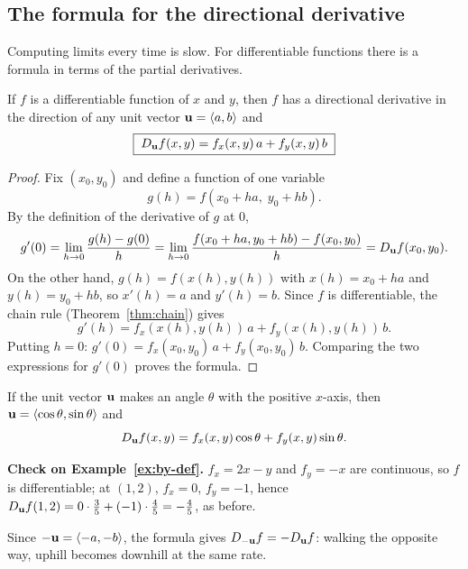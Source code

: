 \subsection{The formula for the directional derivative}

Computing limits every time is slow. For differentiable functions there is a
formula in terms of the partial derivatives.

\begin{theorem}[Slides]\label{thm:Du-formula}
If $f$ is a differentiable function of $x$ and $y$, then $f$ has a directional
derivative in the direction of any unit vector $\mathbf{u}=\left\langle a,b \right\rangle$ and
\[
  \boxed{\;D_{\mathbf{u}} f(x,y)=f_x(x,y)\,a+f_y(x,y)\,b\;}
\]
\end{theorem}

\begin{proof}
Fix $(x_0,y_0)$ and define a function of one variable
\[
  g(h)=f(x_0+ha,\;y_0+hb).
\]
By the definition of the derivative of $g$ at $0$,
\[
  g'(0)=\lim_{h\to0}\frac{g(h)-g(0)}{h}
       =\lim_{h\to0}\frac{f(x_0+ha,y_0+hb)-f(x_0,y_0)}{h}=D_{\mathbf{u}} f(x_0,y_0).
\]
On the other hand, $g(h)=f(x(h),y(h))$ with $x(h)=x_0+ha$ and $y(h)=y_0+hb$,
so $x'(h)=a$ and $y'(h)=b$. Since $f$ is differentiable, the chain rule
(Theorem~\ref{thm:chain}) gives
\[
  g'(h)=f_x(x(h),y(h))\,a+f_y(x(h),y(h))\,b .
\]
Putting $h=0$: $g'(0)=f_x(x_0,y_0)\,a+f_y(x_0,y_0)\,b$. Comparing the two
expressions for $g'(0)$ proves the formula.
\end{proof}

\begin{corollary}\label{cor:angle}
If the unit vector $\mathbf{u}$ makes an angle $\theta$ with the positive $x$-axis,
then $\mathbf{u}=\left\langle \cos\theta,\sin\theta \right\rangle$ and
\[
  D_{\mathbf{u}} f(x,y)=f_x(x,y)\cos\theta+f_y(x,y)\sin\theta .
\]
\end{corollary}

\textbf{Check on Example~\ref{ex:by-def}.} $f_x=2x-y$ and $f_y=-x$ are
continuous, so $f$ is differentiable; at $(1,2)$, $f_x=0$, $f_y=-1$, hence
$D_{\mathbf{u}} f(1,2)=0\cdot\frac35+(-1)\cdot\frac45=-\frac45$, as before.\checkok

\begin{remark}
Since $-\mathbf{u}=\left\langle -a,-b \right\rangle$, the formula gives $D_{-\mathbf{u}}f=-D_{\mathbf{u}} f$: walking the
opposite way, uphill becomes downhill at the same rate.
\end{remark}

